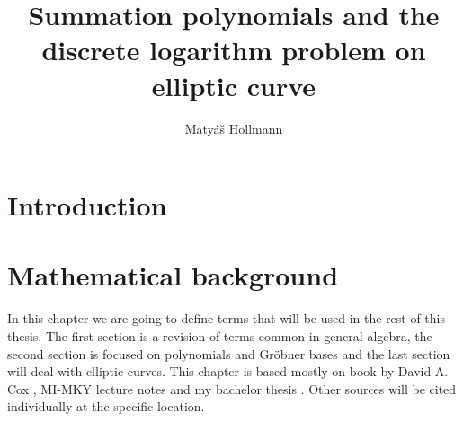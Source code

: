 \documentclass[thesis=M,english]{FITthesis}[2012/10/20]
\title{Summation polynomials and the discrete logarithm problem on elliptic curve}
\author{Matyáš Hollmann} %
\theoremstyle{remark}
\theoremstyle{definition}
\begin{document}

\chapter{Introduction}

\chapter{Mathematical background}\label{mathBG}
%
 In this chapter we are going to define terms that will be used in the rest of this thesis. The first section is a revision of terms common in general algebra, the second section is focused on polynomials and Gröbner bases and the last section will deal with elliptic curves. This chapter is based mostly on book by David A. Cox \cite{algGeom}, MI-MKY lecture notes \cite{mky} and my bachelor thesis \cite{myBP}. Other sources will be cited individually at the specific location.
\end{document}
